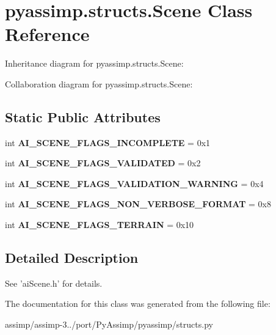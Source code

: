 \hypertarget{classpyassimp_1_1structs_1_1_scene}{\section{pyassimp.\+structs.\+Scene Class Reference}
\label{classpyassimp_1_1structs_1_1_scene}
}


Inheritance diagram for pyassimp.\+structs.\+Scene\+:


Collaboration diagram for pyassimp.\+structs.\+Scene\+:
\subsection*{Static Public Attributes}
\begin{DoxyCompactItemize}
\item 
\hypertarget{classpyassimp_1_1structs_1_1_scene_a159e13eb84709d01357ec6ab91b5b866}{int {\bfseries A\+I\+\_\+\+S\+C\+E\+N\+E\+\_\+\+F\+L\+A\+G\+S\+\_\+\+I\+N\+C\+O\+M\+P\+L\+E\+T\+E} = 0x1}\label{classpyassimp_1_1structs_1_1_scene_a159e13eb84709d01357ec6ab91b5b866}

\item 
\hypertarget{classpyassimp_1_1structs_1_1_scene_a494a99bf448aaf9923453ba3d376f27e}{int {\bfseries A\+I\+\_\+\+S\+C\+E\+N\+E\+\_\+\+F\+L\+A\+G\+S\+\_\+\+V\+A\+L\+I\+D\+A\+T\+E\+D} = 0x2}\label{classpyassimp_1_1structs_1_1_scene_a494a99bf448aaf9923453ba3d376f27e}

\item 
\hypertarget{classpyassimp_1_1structs_1_1_scene_aa3c54081210c1772dab36765e999222f}{int {\bfseries A\+I\+\_\+\+S\+C\+E\+N\+E\+\_\+\+F\+L\+A\+G\+S\+\_\+\+V\+A\+L\+I\+D\+A\+T\+I\+O\+N\+\_\+\+W\+A\+R\+N\+I\+N\+G} = 0x4}\label{classpyassimp_1_1structs_1_1_scene_aa3c54081210c1772dab36765e999222f}

\item 
\hypertarget{classpyassimp_1_1structs_1_1_scene_ac2b254335d8e185c05554cbbde4a5a90}{int {\bfseries A\+I\+\_\+\+S\+C\+E\+N\+E\+\_\+\+F\+L\+A\+G\+S\+\_\+\+N\+O\+N\+\_\+\+V\+E\+R\+B\+O\+S\+E\+\_\+\+F\+O\+R\+M\+A\+T} = 0x8}\label{classpyassimp_1_1structs_1_1_scene_ac2b254335d8e185c05554cbbde4a5a90}

\item 
\hypertarget{classpyassimp_1_1structs_1_1_scene_ab15f8b1cdbf4f786491192dec416a141}{int {\bfseries A\+I\+\_\+\+S\+C\+E\+N\+E\+\_\+\+F\+L\+A\+G\+S\+\_\+\+T\+E\+R\+R\+A\+I\+N} = 0x10}\label{classpyassimp_1_1structs_1_1_scene_ab15f8b1cdbf4f786491192dec416a141}

\end{DoxyCompactItemize}


\subsection{Detailed Description}
\begin{DoxyVerb}See 'aiScene.h' for details.
\end{DoxyVerb}
 

The documentation for this class was generated from the following file\+:\begin{DoxyCompactItemize}
\item 
assimp/assimp-\/3../port/\+Py\+Assimp/pyassimp/structs.\+py\end{DoxyCompactItemize}
